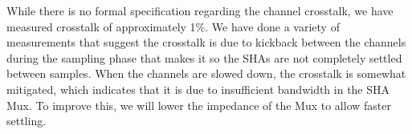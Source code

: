 \label{sec:5.7}


While there is no formal specification regarding the channel crosstalk, we have measured crosstalk of approximately 1\%. We have done a variety of measurements that suggest the crosstalk is due to kickback between the channels during the sampling phase that makes it so the SHAs are not completely settled between samples. When the channels are slowed down, the crosstalk is somewhat mitigated, which indicates that it is due to insufficient bandwidth in the SHA Mux. To improve this, we will lower the impedance of the Mux to allow faster settling.
